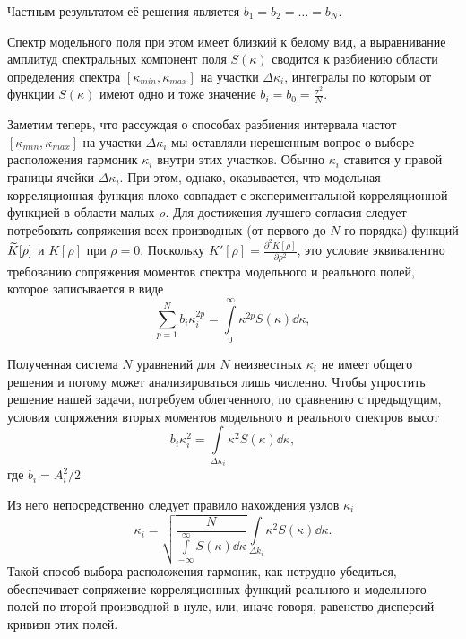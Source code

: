 Частным результатом её решения является $b_1 = b_2 = \dots = b_N$.

Спектр модельного поля при этом имеет близкий к белому вид, а выравнивание
амплитуд спектральных компонент поля $S(\kappa)$ сводится к разбиению области
определения спектра $[\kappa_{min},\kappa_{max}]$ на участки $\Delta
\kappa_i$, интегралы по
которым от функции  $S(\kappa)$ имеют одно и тоже значение $b_i = b_{0} =
\frac{\sigma^2}{N}$.

Заметим теперь, что рассуждая о способах разбиения интервала частот
$[\kappa_{min},
\kappa_{max}]$ на участки $\Delta \kappa_i$ мы оставляли нерешенным вопрос о выборе
расположения гармоник $\kappa_i$ внутри этих участков. Обычно  $\kappa_i$ ставится у
правой границы ячейки  $\Delta \kappa_i$. При этом, однако, оказывается, что
модельная корреляционная функция плохо совпадает с экспериментальной
корреляционной функцией в области малых  $\rho$. Для достижения лучшего
согласия следует потребовать сопряжения всех производных (от первого до $N$-го
порядка) функций $\widetilde K[\rho]$ и  $K[\rho]$ при  $\rho=0$. 
Поскольку $K'[\rho] = \frac{\partial^2 K[\rho]}{\partial \rho^2}$, это условие эквивалентно
требованию сопряжения моментов спектра модельного и реального полей, которое
записывается в виде
 \begin{equation}
    \sum\limits_{p=1}^{N} b_i \kappa_i^{2p} 
    = \int\limits_{0}^{\infty} \kappa^{2p}S(\kappa) \dd \kappa, 
\end{equation}

Полученная система $N$ уравнений для $N$ неизвестных $\kappa_i$ не имеет общего
решения и потому может анализироваться лишь численно. Чтобы упростить решение
нашей задачи, потребуем облегченного, по сравнению с предыдущим, условия
сопряжения вторых моментов модельного и реального спектров высот
 \begin{equation}
    b_i \kappa_i^2 = \int\limits_{\Delta \kappa_i} \kappa^2 S(\kappa) \dd \kappa,
\end{equation}
где $b_i= A_i^2 / 2$

Из него непосредственно следует правило нахождения узлов $\kappa_i$ 
\begin{equation}
    \label{eq:ki}
    {
        \kappa_i = \sqrt{\frac{N}{\int\limits_{-\infty}^{\infty} S(\kappa) \dd
        \kappa}} \int\limits_{\Delta k_i} \kappa^2
        S(\kappa) \dd \kappa. 
    }
\end{equation}
Такой способ выбора расположения гармоник, как нетрудно убедиться, обеспечивает
сопряжение корреляционных функций реального и модельного полей по второй
производной в нуле, или, иначе говоря, равенство дисперсий кривизн этих
полей.

